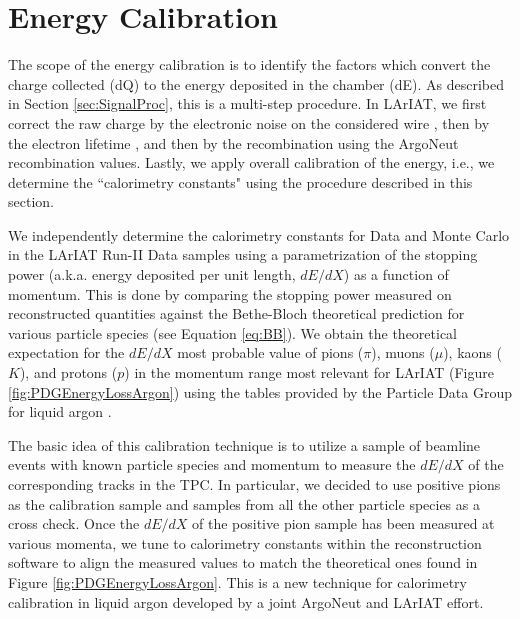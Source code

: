 \chapter{Energy Calibration}\label{ch:energyCalibration}

The scope of the energy calibration is to identify the factors which convert the charge collected (dQ) to the energy deposited in the chamber (dE). As described in Section \ref{sec:SignalProc}, this is a multi-step procedure. In LArIAT, we first correct the raw charge by the electronic noise on the considered wire \cite{LArIATdqdx}, then by the electron lifetime \cite{LArIATLifeTime},  and then by the recombination using the ArgoNeut recombination values. Lastly, we apply overall calibration of the energy, i.e., we determine the ``calorimetry constants" using the procedure described in this section.


We independently determine  the calorimetry constants for Data and Monte Carlo in the LArIAT Run-II Data samples using  a parametrization of the stopping power (a.k.a. energy deposited per unit length, $dE/dX$)  as a function of momentum. This is done by comparing the stopping power measured on reconstructed quantities against the Bethe-Bloch theoretical prediction for various particle species (see Equation \ref{eq:BB}).  We obtain the theoretical expectation for the $dE/dX$ most probable value of pions ($\pi$), muons ($\mu$), kaons ($K$), and protons ($p$) in the momentum range most relevant for LArIAT (Figure \ref{fig:PDGEnergyLossArgon}) using the tables provided by the Particle Data Group \cite{Patrignani:2016xqp} for liquid argon \cite{PDG-Argon}.

The basic idea of this calibration technique is to utilize a sample of beamline events with known particle species and momentum to measure the $dE/dX$ of the corresponding tracks in the TPC. In particular, we decided to use positive pions as the calibration sample and samples from all the other particle species as a cross check. Once the $dE/dX$ of the positive pion sample  has been measured at various momenta, we tune to calorimetry constants within the reconstruction software to align the measured values to match the theoretical ones found in Figure \ref{fig:PDGEnergyLossArgon}. This is a new technique for calorimetry calibration in liquid argon developed by a joint ArgoNeut and  LArIAT effort.

